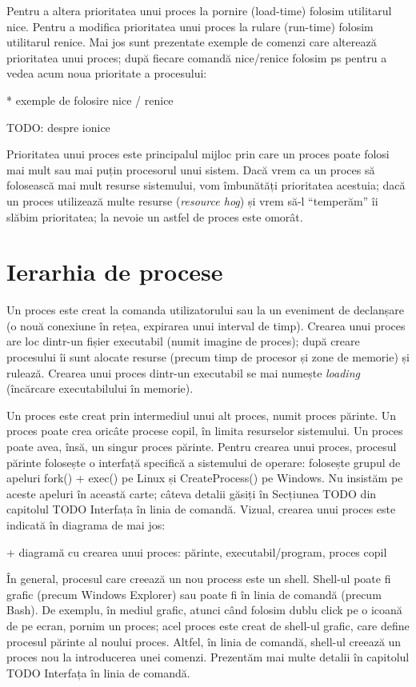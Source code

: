 Pentru a altera prioritatea unui proces la pornire (load-time) folosim
utilitarul nice. Pentru a modifica prioritatea unui proces la rulare (run-time)
folosim utilitarul renice. Mai jos sunt prezentate exemple de comenzi care
alterează prioritatea unui proces; după fiecare comandă nice/renice folosim ps
pentru a vedea acum noua prioritate a procesului:

* exemple de folosire nice / renice

TODO: despre ionice

Prioritatea unui proces este principalul mijloc prin care un proces poate folosi
mai mult sau mai puțin procesorul unui sistem. Dacă vrem ca un proces să
folosească mai mult resurse sistemului, vom îmbunătăți prioritatea acestuia;
dacă un proces utilizează multe resurse (\textit{resource hog}) și vrem să-l
“temperăm” îi slăbim prioritatea; la nevoie un astfel de proces este omorât.

\section{Ierarhia de procese}

Un proces este creat la comanda utilizatorului sau la un eveniment de declanșare
(o nouă conexiune în rețea, expirarea unui interval de timp). Crearea unui
proces are loc dintr-un fișier executabil (numit imagine de proces); după creare
procesului îi sunt alocate resurse (precum timp de procesor și zone de memorie)
și rulează. Crearea unui proces dintr-un executabil se mai numește
\textit{loading} (încărcare executabilului în memorie).

Un proces este creat prin intermediul unui alt proces, numit proces părinte. Un
proces poate crea oricâte procese copil, în limita resurselor sistemului. Un
proces poate avea, însă, un singur proces părinte. Pentru crearea unui proces,
procesul părinte folosește o interfață specifică a sistemului de operare:
folosește grupul de apeluri fork() + exec() pe Linux și CreateProcess() pe
Windows. Nu insistăm pe aceste apeluri în această carte; câteva detalii găsiți
în Secțiunea TODO din capitolul TODO Interfața în linia de comandă. Vizual,
crearea unui proces este indicată în diagrama de mai jos:

+     diagramă cu crearea unui proces: părinte, executabil/program, proces copil

În general, procesul care creează un nou process este un shell. Shell-ul poate
fi grafic (precum Windows Explorer) sau poate fi în linia de comandă (precum
Bash). De exemplu, în mediul grafic, atunci când folosim dublu click pe o icoană
de pe ecran, pornim un proces; acel proces este creat de shell-ul grafic, care
define procesul părinte al noului proces. Altfel, în linia de comandă, shell-ul
creează un proces nou la introducerea unei comenzi. Prezentăm mai multe detalii
în capitolul TODO Interfața în linia de comandă.

